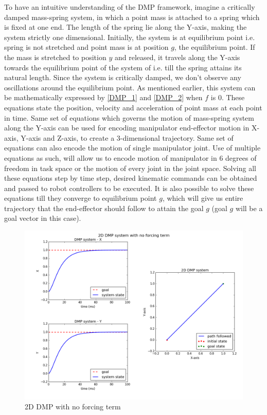 To have an intuitive understanding of the DMP framework, imagine a critically damped mass-spring system, in which a point mass is attached to a spring which is fixed at one end. The length of the spring lie along the Y-axis, making the system strictly one dimensional. Initially, the system is at equilibrium point i.e. spring is not stretched and point mass is at position $g$, the equilibrium point. If the mass is stretched to position $y$ and released, it travels along the Y-axis towards the equilibrium point of the system of i.e. till the spring attains its natural length. Since the system is critically damped, we don't observe any oscillations around the equilibrium point. As mentioned earlier, this system can be mathematically expressed by \ref{DMP_1} and \ref{DMP_2} when $f$ is 0. These equations state the position, velocity and acceleration of point mass at each point in time. Same set of equations which governs the motion of mass-spring system along the Y-axis can be used for encoding manipulator end-effector motion in X-axis, Y-axis and Z-axis, to create a 3-dimensional trajectory. Same set of equations can also encode the motion of single manipulator joint. Use of multiple equations as such, will allow us to encode motion of manipulator in 6 degrees of freedom in task space or the motion of every joint in the joint space. Solving all these equations step by time step, desired kinematic commands can be obtained and passed to robot controllers to be executed. It is also possible to solve these equations till they converge to equilibrium point $g$, which will give us entire trajectory that the end-effector should follow to attain the goal $g$ (goal $g$ will be a goal vector in this case).  

 

\begin{figure}[H]
	\includegraphics[width=\textwidth]{images/dmp_no_f.png}
	\caption{2D DMP with no forcing term}
	\label{fig:DMP_2DOF}
\end{figure}

